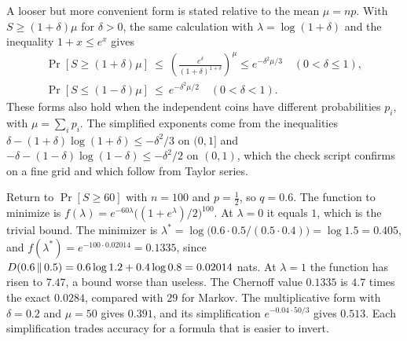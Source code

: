 A looser but more convenient form is stated relative to the mean $\mu=np$. With $S\ge(1+\delta)\mu$ for $\delta>0$, the same calculation with $\lambda=\log(1+\delta)$ and the inequality $1+x\le e^x$ gives
\begin{equation}
\begin{gathered}
\Pr[S\ge(1+\delta)\mu]\ \le\ \left(\frac{e^\delta}{(1+\delta)^{1+\delta}}\right)^{\!\mu}\le e^{-\delta^2\mu/3}\quad(0<\delta\le1),\\
\Pr[S\le(1-\delta)\mu]\ \le\ e^{-\delta^2\mu/2}\quad(0<\delta<1).
\end{gathered}
\label{eq:ch12:chernoff-mult}
\end{equation}
These forms also hold when the independent coins have different probabilities $p_i$, with $\mu=\sum_ip_i$. The simplified exponents come from the inequalities $\delta-(1+\delta)\log(1+\delta)\le-\delta^2/3$ on $(0,1]$ and $-\delta-(1-\delta)\log(1-\delta)\le-\delta^2/2$ on $(0,1)$, which the check script confirms on a fine grid and which follow from Taylor series.

\begin{example}\label{ex:ch12:tune}
Return to $\Pr[S\ge60]$ with $n=100$ and $p=\tfrac12$, so $q=0.6$. The function to minimize is $f(\lambda)=e^{-60\lambda}\big((1+e^\lambda)/2\big)^{100}$. At $\lambda=0$ it equals $1$, which is the trivial bound. The minimizer is $\lambda^*=\log\big(0.6\cdot0.5/(0.5\cdot0.4)\big)=\log1.5=0.405$, and $f(\lambda^*)=e^{-100\cdot0.02014}=0.1335$, since $D\!\left(0.6\,\middle\|\,0.5\right)=0.6\log1.2+0.4\log0.8=0.02014$ nats. At $\lambda=1$ the function has risen to $7.47$, a bound worse than useless. The Chernoff value $0.1335$ is $4.7$ times the exact $0.0284$, compared with $29$ for Markov. The multiplicative form with $\delta=0.2$ and $\mu=50$ gives $0.391$, and its simplification $e^{-0.04\cdot50/3}$ gives $0.513$. Each simplification trades accuracy for a formula that is easier to invert.
\end{example}

